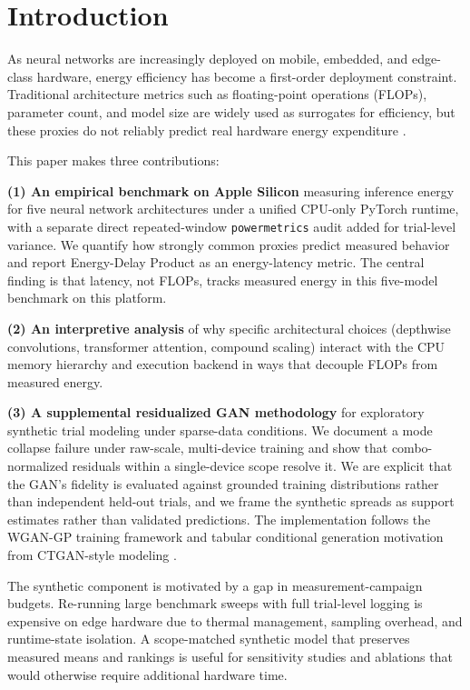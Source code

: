 \documentclass[conference]{IEEEtran}
\begin{document}
\section{Introduction}
As neural networks are increasingly deployed on mobile, embedded, and
edge-class hardware, energy efficiency has become a first-order deployment
constraint. Traditional architecture metrics such as floating-point operations
(FLOPs), parameter count, and model size are widely used as surrogates for
efficiency, but these proxies do not reliably predict real hardware energy
expenditure \cite{horowitz2014,mittal2019,hardwareaware2019,eyeriss2017}.

This paper makes three contributions:

\textbf{(1) An empirical benchmark on Apple Silicon} measuring inference
energy for five neural network architectures under a unified CPU-only PyTorch
runtime, with a separate direct repeated-window \texttt{powermetrics} audit
added for trial-level variance. We quantify how strongly common proxies
predict measured behavior and report Energy-Delay Product as an
energy-latency metric. The central finding is that latency, not FLOPs, tracks
measured energy in this five-model benchmark on this platform.

\textbf{(2) An interpretive analysis} of why specific architectural choices
(depthwise convolutions, transformer attention, compound scaling) interact with
the CPU memory hierarchy and execution backend in ways that decouple FLOPs from
measured energy.

\textbf{(3) A supplemental residualized GAN methodology} for exploratory
synthetic trial modeling under sparse-data conditions. We document a mode
collapse failure under raw-scale, multi-device training and show that
combo-normalized residuals within a single-device scope resolve it. We are
explicit that the GAN's fidelity is evaluated against grounded training
distributions rather than independent held-out trials, and we frame the
synthetic spreads as support estimates rather than validated predictions. The
implementation follows the WGAN-GP training framework \cite{wgangp2017} and
tabular conditional generation motivation from CTGAN-style modeling
\cite{ctgan2019}.

The synthetic component is motivated by a gap in measurement-campaign
budgets. Re-running large benchmark sweeps with full trial-level logging is
expensive on edge hardware due to thermal management, sampling overhead, and
runtime-state isolation. A scope-matched synthetic model that preserves
measured means and rankings is useful for sensitivity studies and ablations
that would otherwise require additional hardware time.
\end{document}
